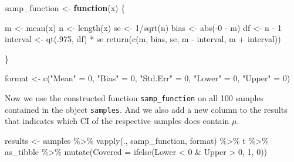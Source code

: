 \documentclass[
]{book}
\newenvironment{Shaded}{\begin{snugshade}}{\end{snugshade}}
\newcommand{\AttributeTok}[1]{\textcolor[rgb]{0.77,0.63,0.00}{#1}}
\newcommand{\ControlFlowTok}[1]{\textcolor[rgb]{0.13,0.29,0.53}{\textbf{#1}}}
\newcommand{\DecValTok}[1]{\textcolor[rgb]{0.00,0.00,0.81}{#1}}
\newcommand{\FunctionTok}[1]{\textcolor[rgb]{0.00,0.00,0.00}{#1}}
\newcommand{\NormalTok}[1]{#1}
\newcommand{\OtherTok}[1]{\textcolor[rgb]{0.56,0.35,0.01}{#1}}
\newcommand{\SpecialCharTok}[1]{\textcolor[rgb]{0.00,0.00,0.00}{#1}}
\newcommand{\StringTok}[1]{\textcolor[rgb]{0.31,0.60,0.02}{#1}}
\begin{document}
\begin{Shaded}
\begin{Highlighting}[]
\NormalTok{samp\_function }\OtherTok{\textless{}{-}} \ControlFlowTok{function}\NormalTok{(x) \{}
 
\NormalTok{  m }\OtherTok{\textless{}{-}} \FunctionTok{mean}\NormalTok{(x)}
\NormalTok{  n }\OtherTok{\textless{}{-}} \FunctionTok{length}\NormalTok{(x)}
\NormalTok{  se }\OtherTok{\textless{}{-}} \DecValTok{1}\SpecialCharTok{/}\FunctionTok{sqrt}\NormalTok{(n)}
\NormalTok{  bias }\OtherTok{\textless{}{-}} \FunctionTok{abs}\NormalTok{(}\SpecialCharTok{{-}}\DecValTok{0} \SpecialCharTok{{-}}\NormalTok{ m)}
\NormalTok{  df }\OtherTok{\textless{}{-}}\NormalTok{ n }\SpecialCharTok{{-}} \DecValTok{1}
\NormalTok{  interval }\OtherTok{\textless{}{-}} \FunctionTok{qt}\NormalTok{(.}\DecValTok{975}\NormalTok{, df) }\SpecialCharTok{*}\NormalTok{ se}
  \FunctionTok{return}\NormalTok{(}\FunctionTok{c}\NormalTok{(m, bias, se, m }\SpecialCharTok{{-}}\NormalTok{ interval, m }\SpecialCharTok{+}\NormalTok{ interval))}

\NormalTok{\}}

\NormalTok{format }\OtherTok{\textless{}{-}} \FunctionTok{c}\NormalTok{(}\StringTok{"Mean"} \OtherTok{=} \DecValTok{0}\NormalTok{, }\StringTok{"Bias"} \OtherTok{=} \DecValTok{0}\NormalTok{, }\StringTok{"Std.Err"} \OtherTok{=} \DecValTok{0}\NormalTok{, }\StringTok{"Lower"} \OtherTok{=} \DecValTok{0}\NormalTok{, }\StringTok{"Upper"} \OtherTok{=} \DecValTok{0}\NormalTok{)}
\end{Highlighting}
\end{Shaded}

Now we use the constructed function \texttt{samp\_function} on all 100 samples contained in the object \texttt{samples}. And we also add a new column to the results that indicates which CI of the respective samples does contain \(\mu\).

\begin{Shaded}
\begin{Highlighting}[]
\NormalTok{results }\OtherTok{\textless{}{-}}\NormalTok{ samples }\SpecialCharTok{\%\textgreater{}\%}
  \FunctionTok{vapply}\NormalTok{(., samp\_function, format) }\SpecialCharTok{\%\textgreater{}\%}
\NormalTok{  t }\SpecialCharTok{\%\textgreater{}\%}
\NormalTok{  as\_tibble }\SpecialCharTok{\%\textgreater{}\%} 
  \FunctionTok{mutate}\NormalTok{(}\AttributeTok{Covered =} \FunctionTok{ifelse}\NormalTok{(Lower }\SpecialCharTok{\textless{}} \DecValTok{0} \SpecialCharTok{\&}\NormalTok{ Upper }\SpecialCharTok{\textgreater{}} \DecValTok{0}\NormalTok{, }\DecValTok{1}\NormalTok{, }\DecValTok{0}\NormalTok{))}
\end{Highlighting}
\end{Shaded}
\end{document}
